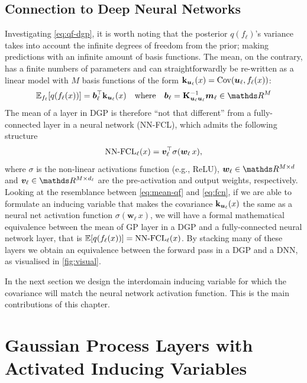 \subsection{Connection to Deep Neural Networks}
Investigating \cref{eq:qf-dgp}, it is worth noting that the posterior $q(f_\ell)$'s variance takes into account the infinite degrees of freedom from the prior; making predictions with an infinite amount of basis functions. The mean, on the contrary, has a finite numbers of parameters and can straightforwardly be re-written as a linear model with $M$ basis functions of the form $\mathbf{k}_{\bm{u}_\ell}(x) = \mathrm{Cov}(\bm{u}_\ell, f_\ell(x))$:
\begin{equation}
    \label{eq:mean-qf}
    \Exp{f_\ell}{q(f_\ell(x))} = \bm{b}_\ell^\top \kul(x) \quad \text{where} \quad \bm{b}_\ell = \Kulul^{-1} \vm_\ell \in \Reals^M
\end{equation}
The mean of a layer in DGP is therefore ``not that different'' from a fully-connected layer in a neural network (NN-FCL), which admits the following structure
\begin{equation}
    \label{eq:fcn}
    \text{NN-FCL}_\ell(x) = \bm{v}_\ell^{\top} \sigma(\bm{w}_\ell\,x),
\end{equation}
where $\sigma$ is the non-linear activations function (e.g., ReLU), $\bm{w}_\ell \in \Reals^{M \times d}$ and $\bm{v}_\ell \in \Reals^{M \times d_\ell}$ are the pre-activation and output weights, respectively. Looking at the resemblance between \cref{eq:mean-qf} and \cref{eq:fcn}, if we are able to formulate an inducing variable that makes the covariance $\mathbf{k}_{\bm{u}_\ell}(x)$ the same as a neural net activation function $\sigma(\bm{w}_\ell\,x)$, we will have a formal mathematical equivalence between the mean of GP layer in a DGP and a fully-connected neural network layer, that is $\mathbb{E}[q(f_\ell(x))] = \text{NN-FCL}_\ell(x)$. By stacking many of these layers we obtain an equivalence between the forward pass in a DGP and a DNN, as visualised in \cref{fig:visual}.

In the next section we design the interdomain inducing variable for which the covariance will match the neural network activation function. This is the main contributions of this chapter. 


\section{Gaussian Process Layers with Activated Inducing Variables}
\label{sec:dnn-for-dgps:model}

